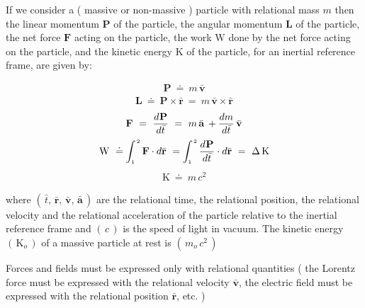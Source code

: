 \documentclass[10pt,fleqn]{article}
\begin{document}
\noindent If we consider a ( massive or non-massive ) particle with relational mass $m$ then the linear momentum $\mathbf{P}$ of the particle, the angular momentum $\mathbf{L}$ of the particle, the net force $\mathbf{F}$ acting on the particle, the work $\mathrm{W}$ done by the net force acting on the particle, and the kinetic energy $\mathrm{K}$ of the particle, for an inertial reference frame, are given by:
\par \vspace{-0.30em}
\begin{eqnarray*}
\mathbf{P} ~\doteq~ m \, \bar{\mathbf{v}}
\end{eqnarray*}
\vspace{-0.60em}
\begin{eqnarray*}
\mathbf{L} ~\doteq~ \mathbf{P} \times \bar{\mathbf{r}} ~=~ m \, \bar{\mathbf{v}} \times \bar{\mathbf{r}}
\end{eqnarray*}
\vspace{-0.30em}
\begin{eqnarray*}
\mathbf{F} ~=~ \dfrac{d\hspace{+0.045em}\mathbf{P}}{d\bar{t}} ~=~ m \, \bar{\mathbf{a}} \, + \dfrac{dm}{d\bar{t}} \, \bar{\mathbf{v}}
\end{eqnarray*}
\vspace{-0.30em}
\begin{eqnarray*}
\mathrm{W} ~\doteq~ \hspace{-0.36em} \int_{\scriptscriptstyle 1}^{\hspace{+0.09em}{\scriptscriptstyle 2}} \mathbf{F} \cdot d\bar{\mathbf{r}} ~=~ \hspace{-0.36em} \int_{\scriptscriptstyle 1}^{\hspace{+0.09em}{\scriptscriptstyle 2}} \dfrac{d\hspace{+0.045em}\mathbf{P}}{d\bar{t}} \cdot d\bar{\mathbf{r}} ~=~ \Delta \, \mathrm{K}
\end{eqnarray*}
\vspace{-0.30em}
\begin{eqnarray*}
\mathrm{K} ~\doteq~ m \, c^2
\end{eqnarray*}
\par \vspace{+0.90em}
\noindent where $( \, \bar{t}, \, \bar{\mathbf{r}}, \, \bar{\mathbf{v}}, \, \bar{\mathbf{a}} \, )$ are the relational time, the relational position, the relational velocity and the relational acceleration of the particle relative to the inertial reference frame and $( \, c \, )$ is the speed of light in vacuum. The kinetic energy $( \, \mathrm{K}_o \, )$ of a massive particle at rest is $( \, m_o \, c^2 \, )$
\par \vspace{+0.90em}
\noindent Forces and fields must be expressed only with relational quantities ( the Lorentz force must be expressed with the relational velocity $\bar{\mathbf{v}}$, the electric field must be expressed with the relational position $\bar{\mathbf{r}}$, etc. )
\end{document}
